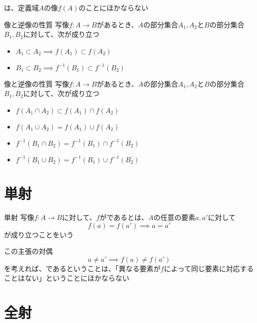 \documentclass[b5paper,12pt]{jsarticle}
\begin{document}
は、定義域$A$の像$f(A)$のことにほかならない

\begin{theorem}{像と逆像の性質}
  写像$f\colon A \to B$があるとき、$A$の部分集合$A_1, A_2$と$B$の部分集合$B_1, B_2$に対して、次が成り立つ
  \begin{itemize}
    \item $A_1 \subset A_2 \implies f(A_1) \subset f(A_2)$
    \item $B_1 \subset B_2 \implies f^{-1}(B_1) \subset f^{-1}(B_2)$
  \end{itemize}
\end{theorem}

\begin{theorem}{像と逆像の性質}
  写像$f\colon A \to B$があるとき、$A$の部分集合$A_1, A_2$と$B$の部分集合$B_1, B_2$に対して、次が成り立つ
  \begin{itemize}
    \item $f(A_1 \cap A_2) \subset f(A_1) \cap f(A_2)$
    \item $f(A_1 \cup A_2) = f(A_1) \cup f(A_2)$
    \item $f^{-1}(B_1 \cap B_2) = f^{-1}(B_1) \cap f^{-1}(B_2)$
    \item $f^{-1}(B_1 \cup B_2) = f^{-1}(B_1) \cup f^{-1}(B_2)$
  \end{itemize}
\end{theorem}

\sectionline
\section{単射}

\begin{definition}{単射}
  写像$f\colon A \to B$に対して、$f$がであるとは、$A$の任意の要素$a, a'$に対して
  \begin{equation*}
    f(a) = f(a') \implies a = a'
  \end{equation*}
  が成り立つことをいう
\end{definition}

この主張の対偶
\begin{equation*}
  a \ne a' \implies f(a) \ne f(a')
\end{equation*}
を考えれば、であるということは、「異なる要素が$f$によって同じ要素に対応することはない」ということにほかならない

\sectionline
\section{全射}
\end{document}

